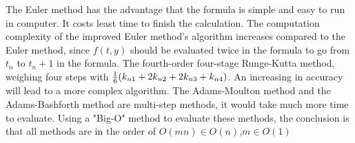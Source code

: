 \documentclass[a4paper]{article}
\begin{document}
\begin{table}[H]
\centering
{}
\caption{Time Consuming  with different h in IVP2}
\label{tab:IVP2}
\end{table}

    The Euler method has the advantage that the formula is simple and easy to run in computer. It costs least time to finish the calculation.
    The computation complexity of the improved Euler method’s algorithm increases compared to the Euler method, since $f(t,y)$ should be evaluated twice in the formula to go from $t_n$ to $t_n+1$ in the formula.
    The fourth-order four-stage Runge-Kutta method, weighing four steps with ${1\over6}(k_{n1}+2k_{n2}+2k_{n3}+k_{n4})$. An increasing in accuracy will lead to a more complex algorithm.
    The Adams-Moulton method and the Adams-Bashforth method are multi-step methods, it would take much more time to evaluate.
    Using a "Big-O" method to evaluate these methods, the conclusion is that all methods are in the order of $O(mn)\in{O(n)}$,$m\in{O(1)}$
    
\end{document}
